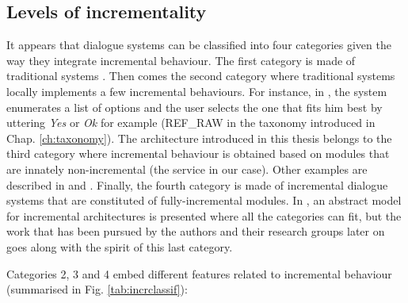 	\subsection{Levels of incrementality}
    
    	It appears that dialogue systems can be classified into four categories given the way they integrate incremental behaviour. The first category is made of traditional systems \cite{CLASSiCd64}. Then comes the second category where traditional systems locally implements a few incremental behaviours. For instance, in \cite{El-Asri2014a}, the system enumerates a list of options and the user selects the one that fits him best by uttering \textit{Yes} or \textit{Ok} for example (REF\_RAW in the taxonomy introduced in Chap. \ref{ch:taxonomy}). The architecture introduced in this thesis belongs to the third category where incremental behaviour is obtained based on modules that are innately non-incremental (the service in our case). Other examples are described in \cite{Selfridge2012a} and \cite{Hastie2013}. Finally, the fourth category is made of incremental dialogue systems that are constituted of fully-incremental modules. In \cite{Schlangen2011}, an abstract model for incremental architectures is presented where all the categories can fit, but the work that has been pursued by the authors and their research groups later on goes along with the spirit of this last category.
		
		Categories 2, 3 and 4 embed different features related to incremental behaviour (summarised in Fig. \ref{tab:incrclassif}):

